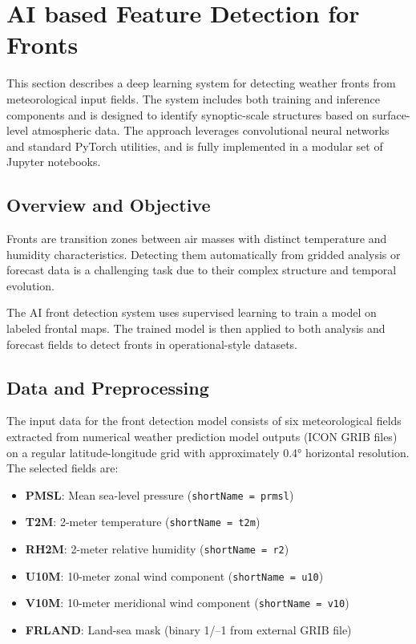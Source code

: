 \section{AI based Feature Detection for Fronts}

This section describes a deep learning system for detecting weather fronts from meteorological input fields. The system includes both training and inference components and is designed to identify synoptic-scale structures based on surface-level atmospheric data. The approach leverages convolutional neural networks and standard PyTorch utilities, and is fully implemented in a modular set of Jupyter notebooks.

\subsection{Overview and Objective}

Fronts are transition zones between air masses with distinct temperature and humidity characteristics. Detecting them automatically from gridded analysis or forecast data is a challenging task due to their complex structure and temporal evolution.

The AI front detection system uses supervised learning to train a model on labeled frontal maps. The trained model is then applied to both analysis and forecast fields to detect fronts in operational-style datasets.

\subsection{Data and Preprocessing}

The input data for the front detection model consists of six meteorological fields extracted from numerical weather prediction model outputs (ICON GRIB files) on a regular latitude-longitude grid with approximately 0.4° horizontal resolution. The selected fields are:

\begin{itemize}
  \item {\bf PMSL}: Mean sea-level pressure (\texttt{shortName = prmsl})
  \item {\bf T2M}: 2-meter temperature (\texttt{shortName = t2m})
  \item {\bf RH2M}: 2-meter relative humidity (\texttt{shortName = r2})
  \item {\bf U10M}: 10-meter zonal wind component (\texttt{shortName = u10})
  \item {\bf V10M}: 10-meter meridional wind component (\texttt{shortName = v10})
  \item {\bf FRLAND}: Land-sea mask (binary 1/–1 from external GRIB file)
\end{itemize}

